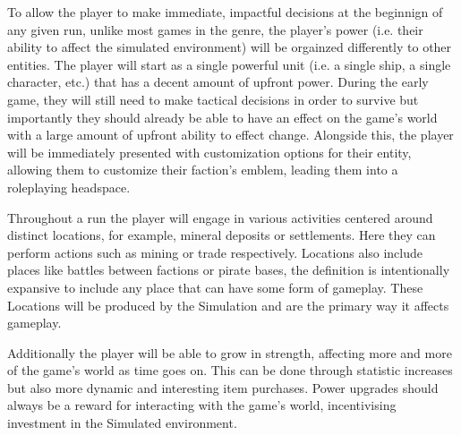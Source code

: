 \documentclass{report}
\begin{document}
To allow the player to make immediate, impactful decisions at the beginnign of any given run, unlike most games in the genre, the player's power (i.e. their ability to affect the simulated environment) will be orgainzed differently to other entities. The player will start as a single powerful unit (i.e. a single ship, a single character, etc.) that has a decent amount of upfront power. During the early game, they will still need to make tactical decisions in order to survive but importantly they should already be able to have an effect on the game's world with a large amount of upfront ability to effect change. Alongside this, the player will be immediately presented with customization options for their entity, allowing them to customize their faction's emblem, leading them into a roleplaying headspace.

Throughout a run the player will engage in various activities centered around distinct locations, for example, mineral deposits or settlements. Here they can perform actions such as mining or trade respectively. Locations also include places like battles between factions or pirate bases, the definition is intentionally expansive to include any place that can have some form of gameplay. These Locations will be produced by the Simulation and are the primary way it affects gameplay.

Additionally the player will be able to grow in strength, affecting more and more of the game's world as time goes on. This can be done through statistic increases but also more dynamic and interesting item purchases. Power upgrades should always be a reward for interacting with the game's world, incentivising investment in the Simulated environment.
\end{document}
